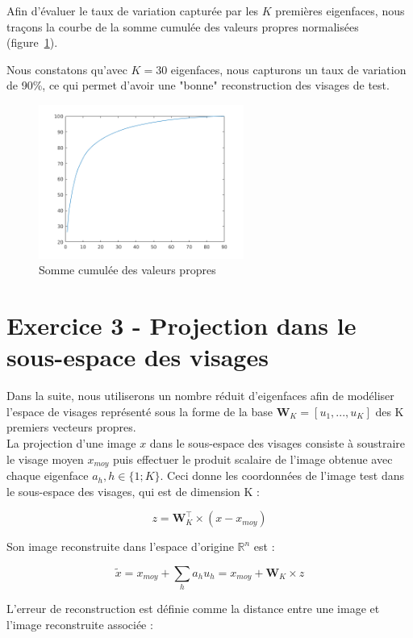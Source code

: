 \documentclass[a4paper]{article}
\newcommand{\figref}[1]{figure~\ref{#1}}
\begin{document}
Afin d'évaluer le taux de variation capturée par les $K$ premières eigenfaces,
nous traçons la courbe de la somme cumulée des valeurs propres normalisées
(\figref{fig:ex2-somme}). 

Nous constatons qu'avec $K = 30$ eigenfaces, nous capturons un taux de variation
de 90\%, ce qui permet d'avoir une "bonne" reconstruction des visages de test.

\begin{figure}[H]
    \center
    \includegraphics[width=0.6\textwidth]{images/ex2_somme.png}
    \caption{Somme cumulée des valeurs propres}
    \label{fig:ex2-somme}
\end{figure}

\newpage

\section*{Exercice 3 - Projection dans le sous-espace des visages}

Dans la suite, nous utiliserons un nombre réduit d’eigenfaces afin de modéliser
l’espace de visages représenté sous la forme de la base $\mathbf{W}_K =
[u_1,...,u_K]$ des K premiers vecteurs propres.\\

La projection d’une image $x$ dans le sous-espace des visages consiste à
soustraire le visage moyen $x_{moy}$ puis effectuer le produit scalaire de
l’image obtenue avec chaque eigenface $a_h, h \in \{1;K\}$. Ceci donne les
coordonnées de l’image test dans le sous-espace des visages, qui est de
dimension K :

$$ z = \mathbf{W}^{\top}_K \times (x - x_{moy})$$

Son image reconstruite dans l'espace d'origine $\mathbb{R}^{n}$ est :

$$ \tilde{x} = x_{moy} + \sum_{h} a_h u_h = x_{moy} + \mathbf{W}_K
\times z $$

L’erreur de reconstruction est définie comme la distance entre une image et l’image
reconstruite associée :
\end{document}
